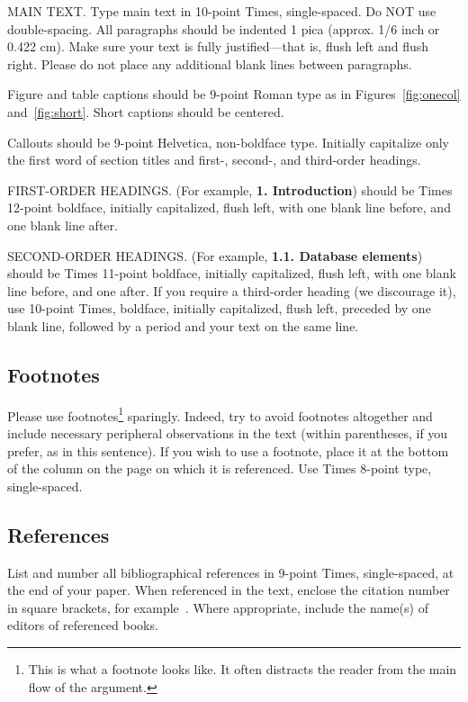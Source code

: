 \documentclass[10pt,twocolumn,letterpaper]{article}
\begin{document}
MAIN TEXT. Type main text in 10-point Times, single-spaced. Do NOT use
double-spacing. All paragraphs should be indented 1 pica (approx. 1/6
inch or 0.422 cm). Make sure your text is fully justified---that is,
flush left and flush right. Please do not place any additional blank
lines between paragraphs.

Figure and table captions should be 9-point Roman type as in
Figures~\ref{fig:onecol} and~\ref{fig:short}.  Short captions should be centered.

\noindent Callouts should be 9-point Helvetica, non-boldface type.
Initially capitalize only the first word of section titles and first-,
second-, and third-order headings.

FIRST-ORDER HEADINGS. (For example, {\large \bf 1. Introduction})
should be Times 12-point boldface, initially capitalized, flush left,
with one blank line before, and one blank line after.

SECOND-ORDER HEADINGS. (For example, { \bf 1.1. Database elements})
should be Times 11-point boldface, initially capitalized, flush left,
with one blank line before, and one after. If you require a third-order
heading (we discourage it), use 10-point Times, boldface, initially
capitalized, flush left, preceded by one blank line, followed by a period
and your text on the same line.

\subsection{Footnotes}

Please use footnotes\footnote {This is what a footnote looks like.  It
often distracts the reader from the main flow of the argument.} sparingly.
Indeed, try to avoid footnotes altogether and include necessary peripheral
observations in
the text (within parentheses, if you prefer, as in this sentence).  If you
wish to use a footnote, place it at the bottom of the column on the page on
which it is referenced. Use Times 8-point type, single-spaced.

\subsection{References}

List and number all bibliographical references in 9-point Times,
single-spaced, at the end of your paper. When referenced in the text,
enclose the citation number in square brackets, for
example~\cite{Authors14}.  Where appropriate, include the name(s) of
editors of referenced books.
\end{document}
